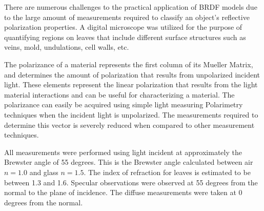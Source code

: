 There are numerous challenges to the practical application of BRDF models due to the large amount of measurements required to classify an object's reflective polarization properties.  A digital microscope was utilized for the purpose of quantifying regions on leaves that include different surface structures such as veins, mold, undulations, cell walls, etc.

The polarizance of a material represents the first column of its Mueller Matrix, and determines the amount of polarization that results from unpolarized incident light.  These elements represent the linear polarization that results from the light material interactions and can be useful for characterizing a material.  The polarizance can easily be acquired using simple light measuring Polarimetry techniques when the incident light is unpolarized.  The measurements required to determine this vector is severely reduced when compared to other measurement techniques.

All measurements were performed using light incident at approximately the Brewster angle of 55 degrees. This is the Brewster angle calculated between air $n=1.0$ and glass $n=1.5$.  The index of refraction for leaves is estimated to be between 1.3 and 1.6. Specular observations were observed at 55 degrees from the normal to the plane of incidence.  The diffuse measurements were taken at 0 degrees from the normal.

